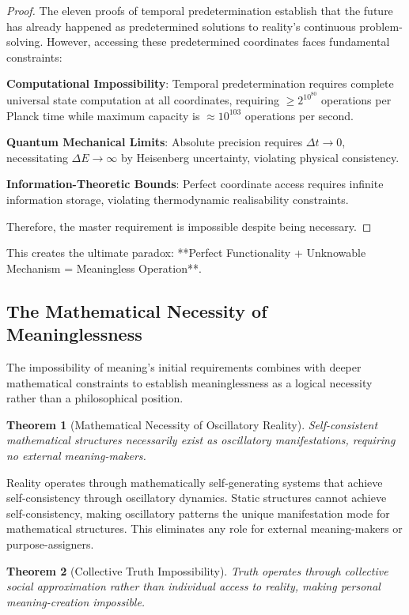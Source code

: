 \documentclass[12pt,a4paper]{article}
\newtheorem{theorem}{Theorem}
\begin{document}
\begin{proof}
The eleven proofs of temporal predetermination establish that the future has already happened as predetermined solutions to reality's continuous problem-solving. However, accessing these predetermined coordinates faces fundamental constraints:

\textbf{Computational Impossibility}: Temporal predetermination requires complete universal state computation at all coordinates, requiring $\geq 2^{10^{80}}$ operations per Planck time while maximum capacity is $\approx 10^{103}$ operations per second.

\textbf{Quantum Mechanical Limits}: Absolute precision requires $\Delta t \to 0$, necessitating $\Delta E \to \infty$ by Heisenberg uncertainty, violating physical consistency.

\textbf{Information-Theoretic Bounds}: Perfect coordinate access requires infinite information storage, violating thermodynamic realisability constraints.

Therefore, the master requirement is impossible despite being necessary.
\end{proof}

This creates the ultimate paradox: **Perfect Functionality + Unknowable Mechanism = Meaningless Operation**.

\subsection{The Mathematical Necessity of Meaninglessness}

The impossibility of meaning's initial requirements combines with deeper mathematical constraints to establish meaninglessness as a logical necessity rather than a philosophical position.

\begin{theorem}[Mathematical Necessity of Oscillatory Reality]
Self-consistent mathematical structures necessarily exist as oscillatory manifestations, requiring no external meaning-makers.
\end{theorem}

Reality operates through mathematically self-generating systems that achieve self-consistency through oscillatory dynamics. Static structures cannot achieve self-consistency, making oscillatory patterns the unique manifestation mode for mathematical structures. This eliminates any role for external meaning-makers or purpose-assigners.

\begin{theorem}[Collective Truth Impossibility]
Truth operates through collective social approximation rather than individual access to reality, making personal meaning-creation impossible.
\end{theorem}
\end{document}
